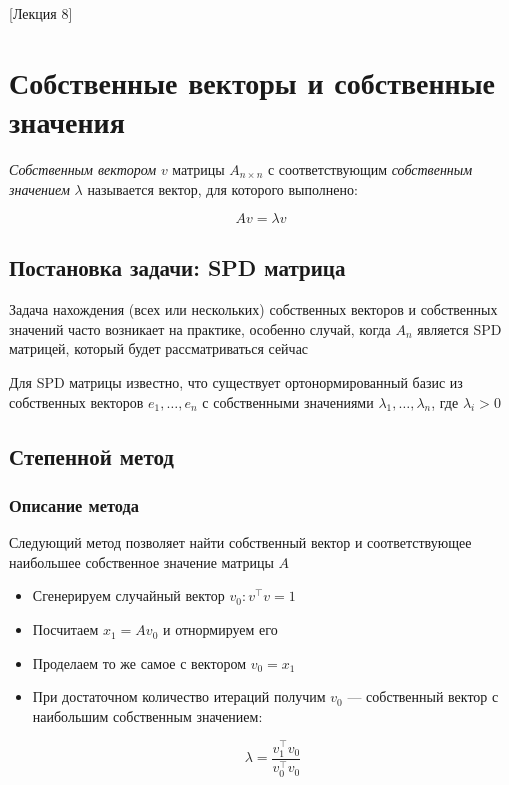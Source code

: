 [Лекция 8]

\newpage

\section{Собственные векторы и собственные значения}

\begin{definition}
    \textit{Собственным вектором} $v$ матрицы $A_{n \times n}$ с соответствующим \textit{собственным значением} $\lambda$ называется вектор, для которого выполнено:

    \[
    A v = \lambda v
    \]
\end{definition}

\subsection*{Постановка задачи: SPD матрица}

Задача нахождения (всех или нескольких) собственных векторов и собственных значений часто возникает на практике, особенно случай, когда $A_n$ является SPD матрицей, который будет рассматриваться сейчас

Для SPD матрицы известно, что существует ортонормированный базис из собственных векторов $e_1, \ldots, e_n$ с собственными значениями $\lambda_1, \ldots, \lambda_n$, где $\lambda_i > 0$

\subsection{Степенной метод}

\subsubsection*{Описание метода}

Следующий метод позволяет найти собственный вектор и соответствующее наибольшее собственное значение матрицы $A$

\begin{itemize}
    \item Сгенерируем случайный вектор $v_0: v^{\top} v = 1$

    \item Посчитаем $x_1 = A v_0$ и отнормируем его

    \item Проделаем то же самое с вектором $v_0 = x_1$

    \item При достаточном количество итераций получим $v_0$ --- собственный вектор с наибольшим собственным значением:

    \[
    \lambda = \frac{v_1^{\top} v_0}{v_0^{\top} v_0}
    \]
\end{itemize}

